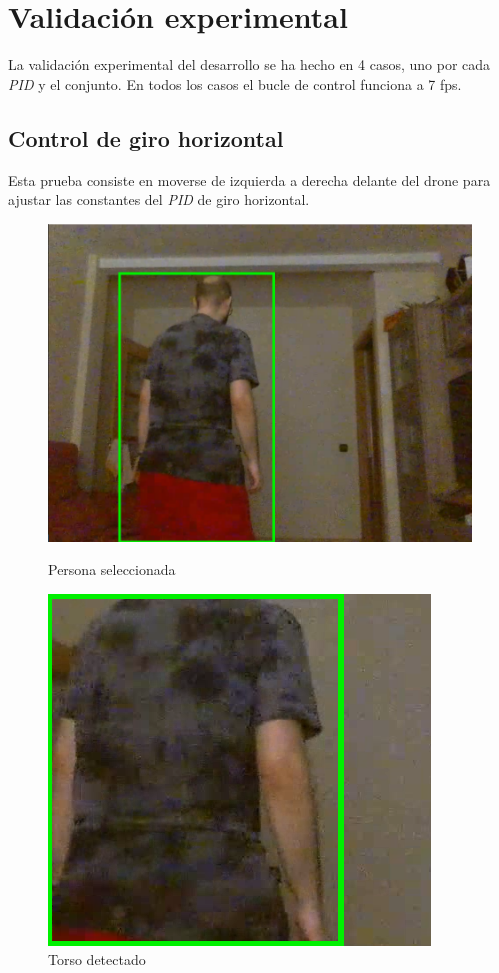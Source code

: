 \section{Validación experimental}
La validación experimental del desarrollo se ha hecho en 4 casos, uno por cada \textit{PID} y el conjunto. En todos los casos el bucle de control funciona a 7 \acrshort{fps}.

\subsection*{Control de giro horizontal}
Esta prueba consiste en moverse de izquierda a derecha delante del drone para ajustar las constantes del \textit{PID} de giro horizontal.

\begin{figure}[!htb]
    \includegraphics[width=\linewidth]{figures/real/cap1.png}
    \caption{Persona seleccionada}\label{fig:real1}
\endminipage\hfill
{}
    \includegraphics[width=\linewidth]{figures/real/cap2.png}
    \caption{Torso detectado}\label{fig:real2}
\endminipage\hfill
\end{figure}
